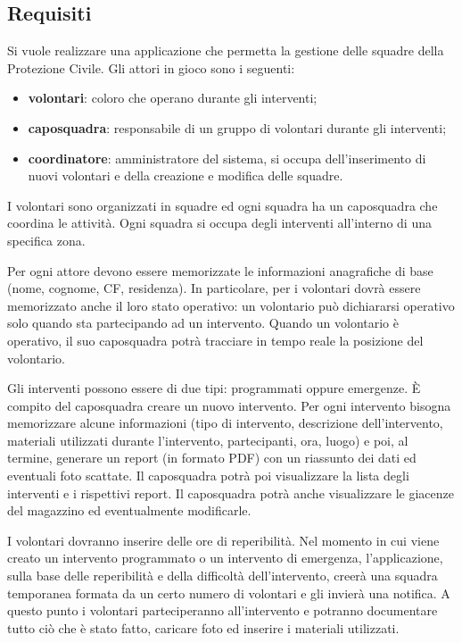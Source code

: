 \subsection{Requisiti}

Si vuole realizzare una applicazione che permetta la gestione delle squadre della Protezione Civile.  
Gli attori in gioco sono i seguenti: 
\begin{itemize}
	\item \textbf{volontari}: coloro che operano durante gli interventi; 
	\item \textbf{caposquadra}: responsabile di un gruppo di volontari durante gli interventi; 
	\item \textbf{coordinatore}: amministratore del sistema, si occupa dell'inserimento di nuovi volontari e della creazione e modifica delle squadre.
\end{itemize}

I volontari sono organizzati in squadre ed ogni squadra ha un caposquadra che coordina le attività. Ogni squadra si occupa degli interventi all’interno di una specifica zona.

Per ogni attore devono essere memorizzate le informazioni anagrafiche di base (nome, cognome, CF, residenza). In particolare, per i volontari dovrà essere memorizzato anche il loro stato operativo: un volontario può dichiararsi operativo solo quando sta partecipando ad un intervento. Quando un volontario è operativo, il suo caposquadra potrà tracciare in tempo reale la posizione del volontario. 

Gli interventi possono essere di due tipi: programmati oppure emergenze. È compito del caposquadra creare un nuovo intervento. Per ogni intervento bisogna memorizzare alcune informazioni (tipo di intervento, descrizione dell'intervento, materiali utilizzati durante l’intervento, partecipanti, ora, luogo) e poi, al termine, generare un report (in formato PDF) con un riassunto dei dati ed eventuali foto scattate. Il caposquadra potrà poi visualizzare la lista degli interventi e i rispettivi report.  Il caposquadra potrà anche visualizzare le giacenze del magazzino ed eventualmente modificarle.

I volontari dovranno inserire delle ore di reperibilità. Nel momento in cui viene creato un intervento programmato o un intervento di emergenza, l’applicazione, sulla base delle reperibilità e della difficoltà dell’intervento, creerà una squadra temporanea formata da un certo numero di volontari e gli invierà una notifica. A questo punto i volontari parteciperanno all’intervento e potranno documentare tutto ciò che è stato fatto, caricare foto ed inserire i materiali utilizzati.

